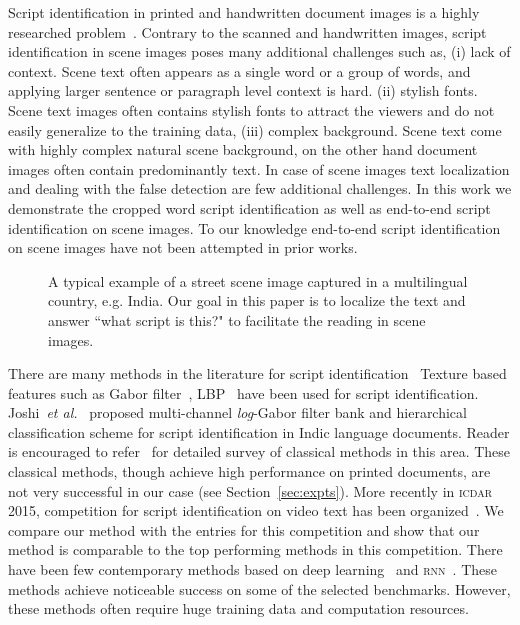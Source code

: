 Script identification in printed and handwritten document
images is a highly researched problem~\cite{GhoshDS10,scriptICDAR15,Pal}. Contrary to the scanned and handwritten images, script identification in scene images poses many additional challenges such as, (i) lack of context. Scene text often appears as a single word or a group of words, and applying larger sentence or paragraph level context is hard. (ii) stylish fonts. Scene text images often contains stylish fonts to attract the viewers and do not easily generalize to the training data, (iii) complex background. Scene text come with highly complex natural scene background, on the other hand document images often contain predominantly text. In case of scene images text localization and dealing with the false detection are few additional challenges. In this work we demonstrate the cropped word script identification as well as end-to-end script identification on scene images. To our knowledge end-to-end script identification on scene images have not been attempted in prior works.
\begin{figure} [!t]
\centering
{}
\caption{A typical example of a street scene image captured in a multilingual country, e.g. India. Our goal in this paper is to localize the text and answer ``what script is this?" to facilitate the reading in scene images.}
\label{fig:firstRes}
\end{figure} 

There are many methods in the literature for script identification~\cite{CVSIComp,GhoshDS10,PhanSDLT11,JoshiGS07,Pati,SIWIcdar}
Texture based features such as Gabor filter~\cite{Pati}, \textsc{LBP}~\cite{LBPOjala2002} have been used for script identification. Joshi~\textit{et al.}~\cite{JoshiGS07} proposed multi-channel \textit{log}-Gabor filter bank and hierarchical classification scheme for script identification in Indic language documents. Reader is encouraged to refer~\cite{GhoshDS10} for detailed survey of classical methods in this area. 
These classical methods, though achieve high performance on printed documents, are not very successful in our case (see Section~\ref{sec:expts}). More recently in \textsc{icdar} 2015, competition for script identification on video text has been organized~\cite{CVSIComp}. We compare our method with the entries for this competition and show that our method is comparable to the top performing methods in this competition. There have been few contemporary methods based on deep learning~\cite{SIWIcdar,CVSIComp} and \textsc{rnn}~\cite{scriptICDAR15}. These methods achieve noticeable success on some of the selected benchmarks. However, these methods often require huge training data and computation resources.
 
